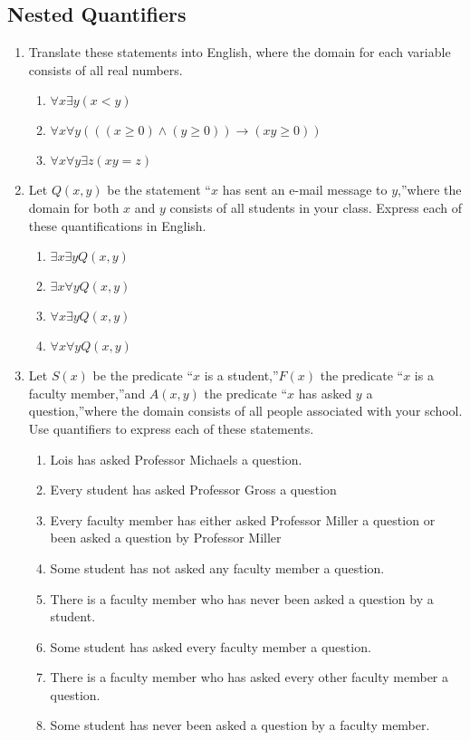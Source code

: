 \documentclass{sig-alternate-05-2015}
\begin{document}
\subsection{Nested Quantifiers}

\begin{enumerate}
\item Translate these statements into English, where the domain
for each variable consists of all real numbers.
\begin{enumerate}
	\item $\forall x \exists y (x < y)$
	\item $\forall x \forall y (((x \ge 0) \wedge (y \ge 0)) \rightarrow (x y \ge 0))$
	\item $\forall x \forall y \exists z (x y = z)$
\end{enumerate}

\item Let $Q(x, y)$ be the statement \textquotedblleft $x$ has sent an e-mail message
to $y$,\textquotedblright where the domain for both $x$ and $y$ consists of
all students in your class. Express each of these quantifications in English.
\begin{enumerate}
	\item $\exists x \exists y Q(x, y)$
	\item $\exists x \forall y Q(x, y)$
	\item $\forall x \exists y Q(x, y)$
	\item $\forall x \forall y Q(x, y)$
\end{enumerate}

\item Let $S(x)$ be the predicate \textquotedblleft $x$ is a student,\textquotedblright $F(x)$ the predicate
\textquotedblleft $x$ is a faculty member,\textquotedblright and $A(x, y)$ the predicate
\textquotedblleft $x$ has asked $y$ a question,\textquotedblright where the domain consists of
all people associated with your school. Use quantifiers to
express each of these statements.
\begin{enumerate}
	\item Lois has asked Professor Michaels a question.
	\item Every student has asked Professor Gross a question
	\item Every faculty member has either asked Professor
	Miller a question or been asked a question by Professor
	Miller
	\item Some student has not asked any faculty member a
	question.
	\item There is a faculty member who has never been asked
	a question by a student.
	\item Some student has asked every faculty member a question.
	\item There is a faculty member who has asked every other
	faculty member a question.
	\item Some student has never been asked a question by a
	faculty member.
\end{enumerate}
	

\end{enumerate}
\end{document}
